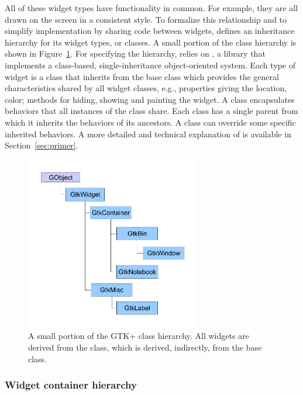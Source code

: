 \documentclass[article,shortnames]{jss}
\begin{document}
All of these widget types have functionality in common. For example,
they are all drawn on the screen in a consistent style. To formalize
this relationship and to simplify implementation by sharing code
between widgets,  defines an inheritance hierarchy for its
widget types, or classes. A small portion of the  class
hierarchy is shown in Figure~\ref{fig:class-hierarchy}. For specifying
the hierarchy,  relies on , a 
library that implements a class-based, single-inheritance
object-oriented system.  Each type of  widget is a
 class that inherits from the base  class
which provides the general characteristics shared by all widget
classes, e.g., properties giving the location, color; methods for
hiding, showing and painting the widget. A  class
encapsulates behaviors that all instances of the class share.  Each
class has a single parent from which it inherits the behaviors of its
ancestors. A class can override some specific inherited behaviors.  A
more detailed and technical explanation of  is available
in Section~\ref{sec:primer}.

\begin{figure}[h!tbp]
\begin{center}
\includegraphics[width=3in]{class-hierarchy.pdf}
\caption{\label{fig:class-hierarchy}A small portion of the GTK+ class
hierarchy. 
All widgets are derived from the  class, which is
derived, 
indirectly, from the  base class.}
\end{center}
\end{figure}

\subsubsection{Widget container hierarchy}
\end{document}
